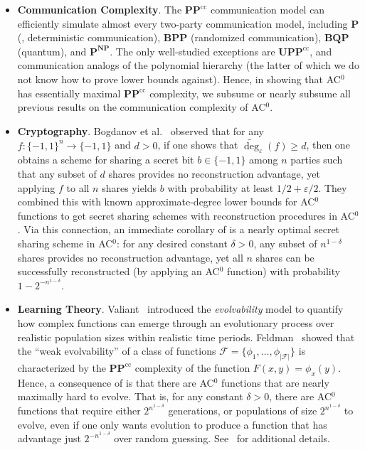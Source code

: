 \documentclass{toc}
\newcommand{\bits}{\{-1,1\}}
\newcommand{\PP}{\mathbf{PP}}
\newcommand{\PPcc}{\mathbf{PP}^{\text{cc}}}
\newcommand{\UPPcc}{\mathbf{UPP}^{\text{cc}}}
\newcommand{\eps}{\varepsilon}
\newcommand{\adeg}{\widetilde{\operatorname{deg}}}
\begin{document}
\begin{itemize}
	\item \textbf{Communication Complexity}. 
	The $\PP^{\text{cc}}$ communication model can efficiently simulate 
	almost every two-party communication model, including $\mathbf{P}$ (\ie, deterministic communication), $\mathbf{BPP}$ (randomized communication), $\mathbf{BQP}$ (quantum), and $\mathbf{P}^{\mathbf{NP}}$.
	The only well-studied exceptions are $\UPPcc$, and communication analogs of the polynomial hierarchy (the latter of which we do not know how to prove lower bounds against).
	Hence, in showing that AC$^0$ has essentially maximal $\PP^{\text{cc}}$  complexity, we subsume or nearly subsume 
	all previous results on the communication complexity of AC$^0$.
	\vspace{-1mm}
	\item \textbf{Cryptography}. Bogdanov et al.~\cite{viola} observed that for any
	$f \colon \bits^n \to \bits$ and $d>0$, 
	if one shows that $\adeg_{\eps}(f) \geq d$, then one obtains a scheme
	for sharing a secret bit $b \in \bits$ among $n$ parties
	such that any subset of $d$ shares provides no reconstruction
	advantage, yet applying $f$ to all $n$ shares yields
	$b$ with probability at least $1/2 + \eps/2$.  They combined
	this with known approximate-degree %
	lower bounds for AC$^0$
	functions to get secret sharing schemes with reconstruction procedures in AC$^0$.
	Via this connection, an immediate corollary of  is a nearly 
	optimal secret sharing scheme in AC$^0$: for any desired constant $\delta > 0$,
	any subset of $n^{1-\delta}$ shares provides no reconstruction
	advantage, yet all $n$ shares can be successfully reconstructed (by applying an AC$^0$ function) with probability
	$1-2^{-n^{1-\delta}}$. 
	\vspace{-1mm}
	\item \textbf{Learning Theory}.
	Valiant~\cite{evolve} introduced the \emph{evolvability} model to quantify how complex functions can emerge through an evolutionary process over realistic population sizes within realistic time
	periods. Feldman~\cite{feldmanevolve} showed that the ``weak evolvability''
	of a class of functions $\mathcal{F} = \{\phi_1, \dots, \phi_{|\mathcal{F}|}\}$
	is characterized by the $\PPcc$ complexity of the function $F(x, y)=\phi_x(y)$. 
	Hence, a consequence of  
	is that there are AC$^0$ functions that are nearly maximally
	hard to evolve. That is, for any constant $\delta > 0$,
	there are AC$^0$ functions that require either $2^{n^{1-\delta}}$ generations, or
	populations of size $2^{n^{1-\delta}}$ to evolve,
	even if one only wants evolution to produce a function that has advantage
	just $2^{-n^{1-\delta}}$ over random guessing. 
	See~\cite{feldmanevolve} for additional details.
	

\end{itemize}
\end{document}
